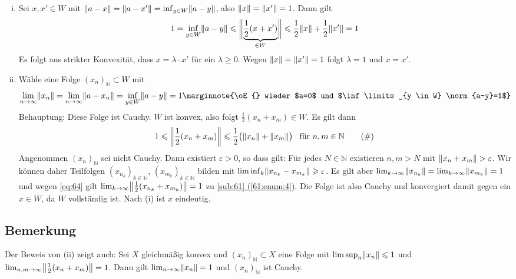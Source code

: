 \begin{enumerate}[(i)]
	\item Sei $x,x' \in W$ mit $\norm{a-x}= \norm{a-x'}= \inf_{y \in W} \norm{a-y}$, also $\norm{x}=\norm{x'}=1$. Dann gilt 
	\[
		1= \inf_{y \in W} \norm{a-y} \le \doppelstrich[\bigg]{\underbrace{\frac{1}{2} (x+x')}_{\in W}} \le \frac{1}{2} \norm{x} + \frac{1}{2} \norm{x'} =1   
	\]
	Es folgt aus strikter Konvexität, dass $x=\lambda \cdot x'$ für ein $\lambda \ge 0$. Wegen $\norm{x}=\norm{x'}=1$ folgt $\lambda=1$ und $x=x'$. 
	\item Wähle eine Folge $(x_n)_{\mathds{N}} \subset W$ mit 
	\[
		\lim_{ n \to \infty} \norm{x_n} = \lim_{ n \to \infty} \norm{a-x_n} = \inf_{y \in W} \norm{a-y} = 1 \marginnote{\oE{} wieder $a=0$ und $\inf\limits_{y \in W} \norm{a-y}=1$}
	\]
	Behauptung: Diese Folge ist Cauchy. $W$ ist konvex, also folgt $\frac{1}{2} (x_n+x_m) \in W$. Es gilt dann 
	\begin{equation*}
		1 \le \norm{\frac{1}{2}(x_n+x_m)} \le \frac{1}{2} \enbrace[\big]{\norm{x_n}+ \norm{x_m}} \enspace\text{ für } n,m \in \mathds{N} \label{eq:64} \tag{\#}
	\end{equation*}
	Angenommen $(x_n)_\mathds{N}$ sei nicht Cauchy. Dann existiert $\varepsilon>0$, so dass gilt: Für jedes $N \in \mathds{N}$ existieren $n,m >N$ mit 
	$\norm{x_n +x_m} >\varepsilon$. Wir können daher Teilfolgen $(x_{n_k})_{k \in \mathds{N}}$, $(x_{m_k})_{k \in \mathds{N}}$ bilden mit 
	$\liminf_k \norm{x_{n_k} - x_{m_k}} \ge \varepsilon$. Es gilt aber $\lim_{ k \to \infty} \norm{x_{n_k}} = \lim_{ k \to \infty} \norm{x_{m_k}}=1$ und wegen \eqref{eq:64}
	gilt $\lim_{ k \to \infty} \norm{\frac{1}{2} (x_{n_k} + x_{m_k})} = 1$ \light zu \hyperref[61:enum:4]{\ref*{sub:61} (\ref*{61:enum:4})}. 
	Die Folge ist also Cauchy und konvergiert damit gegen ein $x \in W$, da $W$ vollständig ist. Nach (i) ist $x$ eindeutig. \bewende
\end{enumerate}

\subsection[Bemerkung über Folge mit $\limsup_n \norm{x_n}\le 1$ in einem gleichmäßig konvexen Raum]{Bemerkung} %
\label{sub:65}
Der Beweis von (ii) zeigt auch: Sei $X$ gleichmäßig konvex und $(x_n)_\mathds{N} \subset X$ eine Folge mit $\limsup_n \norm{x_n}\le 1$ und 
$\lim_{ n,m \to \infty} \norm{\frac{1}{2} (x_n+x_m)}=1$. Dann gilt $\lim_{ n \to \infty} \norm{x_n}=1$ und $(x_n)_{\mathds{N}}$ ist Cauchy.

